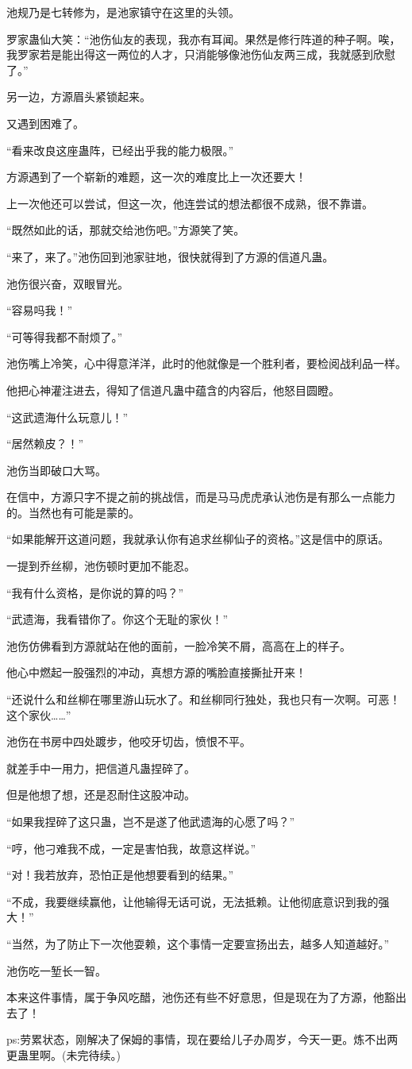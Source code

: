 \begin{this_body}
池规乃是七转修为，是池家镇守在这里的头领。

罗家蛊仙大笑：“池伤仙友的表现，我亦有耳闻。果然是修行阵道的种子啊。唉，我罗家若是能出得这一两位的人才，只消能够像池伤仙友两三成，我就感到欣慰了。”

另一边，方源眉头紧锁起来。

又遇到困难了。

“看来改良这座蛊阵，已经出乎我的能力极限。”

方源遇到了一个崭新的难题，这一次的难度比上一次还要大！

上一次他还可以尝试，但这一次，他连尝试的想法都很不成熟，很不靠谱。

“既然如此的话，那就交给池伤吧。”方源笑了笑。

“来了，来了。”池伤回到池家驻地，很快就得到了方源的信道凡蛊。

池伤很兴奋，双眼冒光。

“容易吗我！”

“可等得我都不耐烦了。”

池伤嘴上冷笑，心中得意洋洋，此时的他就像是一个胜利者，要检阅战利品一样。

他把心神灌注进去，得知了信道凡蛊中蕴含的内容后，他怒目圆瞪。

“这武遗海什么玩意儿！”

“居然赖皮？！”

池伤当即破口大骂。

在信中，方源只字不提之前的挑战信，而是马马虎虎承认池伤是有那么一点能力的。当然也有可能是蒙的。

“如果能解开这道问题，我就承认你有追求丝柳仙子的资格。”这是信中的原话。

一提到乔丝柳，池伤顿时更加不能忍。

“我有什么资格，是你说的算的吗？”

“武遗海，我看错你了。你这个无耻的家伙！”

池伤仿佛看到方源就站在他的面前，一脸冷笑不屑，高高在上的样子。

他心中燃起一股强烈的冲动，真想方源的嘴脸直接撕扯开来！

“还说什么和丝柳在哪里游山玩水了。和丝柳同行独处，我也只有一次啊。可恶！这个家伙……”

池伤在书房中四处踱步，他咬牙切齿，愤恨不平。

就差手中一用力，把信道凡蛊捏碎了。

但是他想了想，还是忍耐住这股冲动。

“如果我捏碎了这只蛊，岂不是遂了他武遗海的心愿了吗？”

“哼，他刁难我不成，一定是害怕我，故意这样说。”

“对！我若放弃，恐怕正是他想要看到的结果。”

“不成，我要继续赢他，让他输得无话可说，无法抵赖。让他彻底意识到我的强大！”

“当然，为了防止下一次他耍赖，这个事情一定要宣扬出去，越多人知道越好。”

池伤吃一堑长一智。

本来这件事情，属于争风吃醋，池伤还有些不好意思，但是现在为了方源，他豁出去了！

ps:劳累状态，刚解决了保姆的事情，现在要给儿子办周岁，今天一更。炼不出两更蛊里啊。(未完待续。)

\end{this_body}

